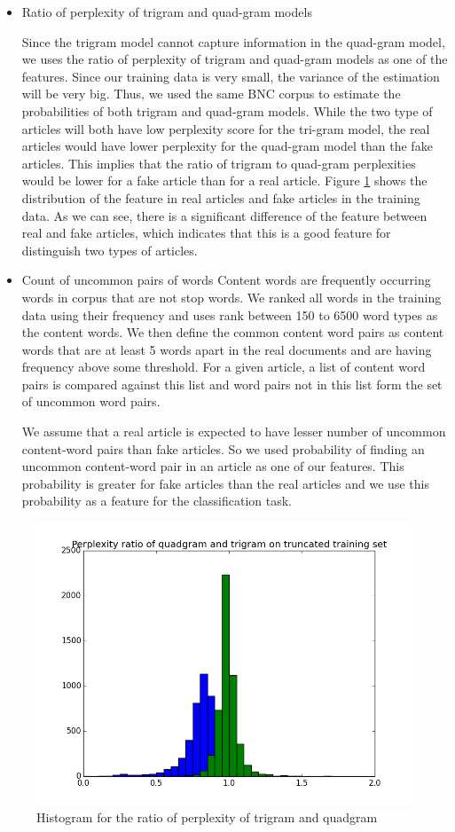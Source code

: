 \begin{itemize}
\item Ratio of perplexity of trigram and quad-gram models

Since the trigram model cannot capture information in the quad-gram model, we uses the ratio of perplexity of trigram and quad-gram models as one of the features. Since our training data is very small, the variance of the estimation will be very big. Thus, we used the same BNC corpus to estimate the probabilities of both trigram and quad-gram models. While the two type of articles will both have low perplexity score for the tri-gram model, the real articles would have lower perplexity for the quad-gram model than the fake articles. This implies that the ratio of trigram to quad-gram perplexities would be lower for a fake article than for a real article. Figure \ref{fig:ratio} shows the distribution of the feature in real articles and fake articles in the training data. As we can see, there is a significant difference of the feature between real and fake articles, which indicates that this is a good feature for distinguish two types of articles. 

\item Count of uncommon pairs of words
Content words are frequently occurring words in corpus that are not stop words. We ranked all words in the training data using their frequency and uses rank between 150 to 6500 word types as the content words. We then define the common content word pairs as content words that are at least 5 words apart in the real documents and are having frequency above some threshold. For a given article, a list of content word pairs is compared against this list and word pairs not in this list form the set of uncommon word pairs. 

We assume that a real article is expected to have lesser number of uncommon content-word pairs than fake articles. So we used probability of finding an uncommon content-word pair in an article as one of our features. This probability is greater for fake articles than the real articles and we use this probability as a feature for the classification task.
\end{itemize}

\begin{figure}
\centering  
\includegraphics[width = \linewidth]{./FIG/030/ratio}\hfill
\caption{Histogram for the ratio of perplexity of trigram and quadgram} \label{fig:ratio}
\end{figure}


